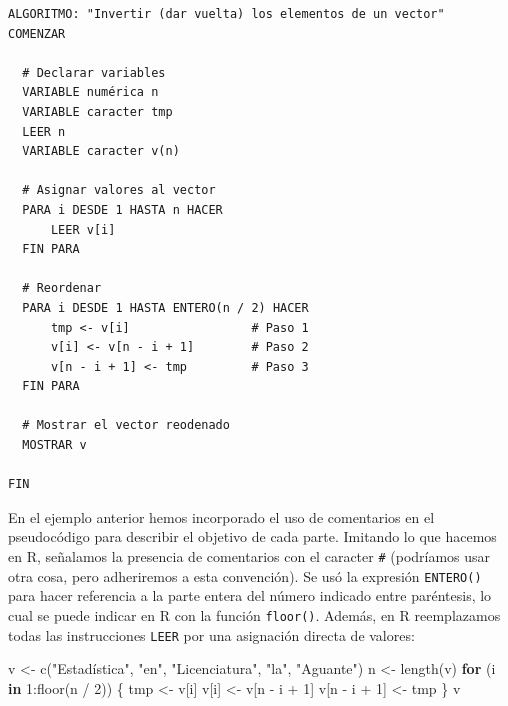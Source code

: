 \documentclass[
]{book}
\newenvironment{Shaded}{\begin{snugshade}}{\end{snugshade}}
\newcommand{\ControlFlowTok}[1]{\textcolor[rgb]{0.13,0.29,0.53}{\textbf{#1}}}
\newcommand{\DecValTok}[1]{\textcolor[rgb]{0.00,0.00,0.81}{#1}}
\newcommand{\FunctionTok}[1]{\textcolor[rgb]{0.00,0.00,0.00}{#1}}
\newcommand{\NormalTok}[1]{#1}
\newcommand{\OtherTok}[1]{\textcolor[rgb]{0.56,0.35,0.01}{#1}}
\newcommand{\SpecialCharTok}[1]{\textcolor[rgb]{0.00,0.00,0.00}{#1}}
\newcommand{\StringTok}[1]{\textcolor[rgb]{0.31,0.60,0.02}{#1}}
\begin{document}
\begin{verbatim}
ALGORITMO: "Invertir (dar vuelta) los elementos de un vector"
COMENZAR
    
  # Declarar variables
  VARIABLE numérica n
  VARIABLE caracter tmp
  LEER n
  VARIABLE caracter v(n)
  
  # Asignar valores al vector
  PARA i DESDE 1 HASTA n HACER
      LEER v[i]
  FIN PARA
  
  # Reordenar
  PARA i DESDE 1 HASTA ENTERO(n / 2) HACER
      tmp <- v[i]                 # Paso 1
      v[i] <- v[n - i + 1]        # Paso 2
      v[n - i + 1] <- tmp         # Paso 3
  FIN PARA
  
  # Mostrar el vector reodenado
  MOSTRAR v
    
FIN
\end{verbatim}

En el ejemplo anterior hemos incorporado el uso de comentarios en el pseudocódigo para describir el objetivo de cada parte. Imitando lo que hacemos en R, señalamos la presencia de comentarios con el caracter \texttt{\#} (podríamos usar otra cosa, pero adheriremos a esta convención). Se usó la expresión \texttt{ENTERO()} para hacer referencia a la parte entera del número indicado entre paréntesis, lo cual se puede indicar en R con la función \texttt{floor()}. Además, en R reemplazamos todas las instrucciones \texttt{LEER} por una asignación directa de valores:

\begin{Shaded}
\begin{Highlighting}[]
\NormalTok{v }\OtherTok{\textless{}{-}} \FunctionTok{c}\NormalTok{(}\StringTok{"Estadística"}\NormalTok{, }\StringTok{"en"}\NormalTok{, }\StringTok{"Licenciatura"}\NormalTok{, }\StringTok{"la"}\NormalTok{, }\StringTok{"Aguante"}\NormalTok{)}
\NormalTok{n }\OtherTok{\textless{}{-}} \FunctionTok{length}\NormalTok{(v)}
\ControlFlowTok{for}\NormalTok{ (i }\ControlFlowTok{in} \DecValTok{1}\SpecialCharTok{:}\FunctionTok{floor}\NormalTok{(n }\SpecialCharTok{/} \DecValTok{2}\NormalTok{)) \{}
\NormalTok{    tmp }\OtherTok{\textless{}{-}}\NormalTok{ v[i]}
\NormalTok{    v[i] }\OtherTok{\textless{}{-}}\NormalTok{ v[n }\SpecialCharTok{{-}}\NormalTok{ i }\SpecialCharTok{+} \DecValTok{1}\NormalTok{]}
\NormalTok{    v[n }\SpecialCharTok{{-}}\NormalTok{ i }\SpecialCharTok{+} \DecValTok{1}\NormalTok{] }\OtherTok{\textless{}{-}}\NormalTok{ tmp}
\NormalTok{\}}
\NormalTok{v}
\end{Highlighting}
\end{Shaded}
\end{document}
